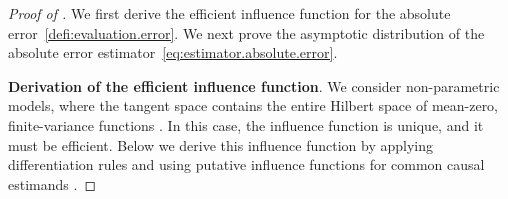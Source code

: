 \begin{proof}[Proof of ] 
    We first derive the efficient influence function for the absolute error~\eqref{defi:evaluation.error}. 
    We next prove the asymptotic distribution of the absolute error estimator~\eqref{eq:estimator.absolute.error}.

    
    \noindent \textbf{Derivation of the efficient influence function}. 
    We consider non-parametric models, where the tangent space contains the entire Hilbert space of mean-zero, finite-variance functions \parencite{tsiatis2006semiparametric}.
    In this case, the influence function is unique, and it must be efficient.
    Below we derive this influence function by applying differentiation rules and using putative influence functions for common causal estimands \parencite{kennedy2022semiparametric}.


\end{proof}
